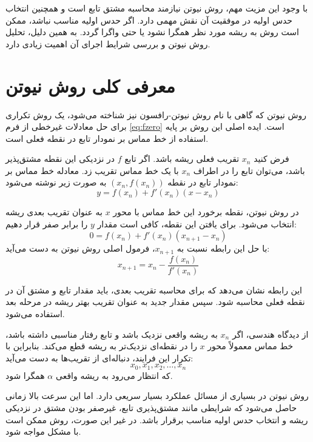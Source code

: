 با وجود این مزیت مهم، روش نیوتن نیازمند محاسبه مشتق تابع است و همچنین انتخاب حدس اولیه در موفقیت آن نقش مهمی دارد. اگر حدس اولیه مناسب نباشد، ممکن است روش به ریشه مورد نظر همگرا نشود یا حتی واگرا گردد. به همین دلیل، تحلیل روش نیوتن و بررسی شرایط اجرای آن اهمیت زیادی دارد.

\section{معرفی کلی روش نیوتن}

روش نیوتن که گاهی با نام روش نیوتن-رافسون نیز شناخته می‌شود، یک روش تکراری برای حل معادلات غیرخطی از فرم \eqref{eq:fzero} است. ایده اصلی این روش بر پایه استفاده از خط مماس بر نمودار تابع در نقطه فعلی است.

فرض کنید $x_n$ تقریب فعلی ریشه باشد. اگر تابع $f$ در نزدیکی این نقطه مشتق‌پذیر باشد، می‌توان تابع را در اطراف $x_n$ با یک خط مماس تقریب زد. معادله خط مماس بر نمودار تابع در نقطه $(x_n,f(x_n))$ به صورت زیر نوشته می‌شود:
\begin{equation}
y=f(x_n)+f'(x_n)(x-x_n)
\label{eq:tangent}
\end{equation}

در روش نیوتن، نقطه برخورد این خط مماس با محور $x$ به عنوان تقریب بعدی ریشه انتخاب می‌شود. برای یافتن این نقطه، کافی است مقدار $y$ را برابر صفر قرار دهیم:
\begin{equation}
0=f(x_n)+f'(x_n)(x_{n+1}-x_n)
\label{eq:tangentzero}
\end{equation}
با حل این رابطه نسبت به $x_{n+1}$، فرمول اصلی روش نیوتن به دست می‌آید:
\begin{equation}
x_{n+1}=x_n-\frac{f(x_n)}{f'(x_n)}
\label{eq:newton}
\end{equation}

این رابطه نشان می‌دهد که برای محاسبه تقریب بعدی، باید مقدار تابع و مشتق آن در نقطه فعلی محاسبه شود. سپس مقدار جدید به عنوان تقریب بهتر ریشه در مرحله بعد استفاده می‌شود.

از دیدگاه هندسی، اگر $x_n$ به ریشه واقعی نزدیک باشد و تابع رفتار مناسبی داشته باشد، خط مماس معمولاً محور $x$ را در نقطه‌ای نزدیک‌تر به ریشه قطع می‌کند. بنابراین با تکرار این فرایند، دنباله‌ای از تقریب‌ها به دست می‌آید:
\[
x_0, x_1, x_2, \dots, x_n
\]
که انتظار می‌رود به ریشه واقعی $\alpha$ همگرا شود.

روش نیوتن در بسیاری از مسائل عملکرد بسیار سریعی دارد. اما این سرعت بالا زمانی حاصل می‌شود که شرایطی مانند مشتق‌پذیری تابع، غیرصفر بودن مشتق در نزدیکی ریشه و انتخاب حدس اولیه مناسب برقرار باشد. در غیر این صورت، روش ممکن است با مشکل مواجه شود.

